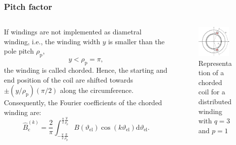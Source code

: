 \begin{frame}
	\frametitle{Pitch factor}
    \begin{columns}
		\begin{column}{0.6\textwidth}
	        If windings are not implemented as diametral winding, i.e., the winding width $y$ is smaller than the pole pitch $\rho_\mathrm{p}$, 
            $$y < \rho_\mathrm{p}=\pi,$$
            the winding is called chorded. Hence, the starting and end position of the coil are shifted towards $\pm(y/\rho_\mathrm{p})(\pi/2)$ along the circumference. Consequently, the Fourier coefficients of the chorded winding are:
            \begin{equation}
                \hat{B}_{\mathrm{c}}^{(k)} = \frac{2}{\pi} \int_{-\frac{\pi}{2}\frac{y}{\rho_\mathrm{p}}}^{\frac{\pi}{2}\frac{y}{\rho_\mathrm{p}}} B(\vartheta_\mathrm{el}) \cos(k \vartheta_\mathrm{el}) \mathrm{d}\vartheta_\mathrm{el}.
                \label{eq:Pitch_factor_fourier_coefficients}
            \end{equation}
        \end{column}
        \begin{column}{0.4\textwidth}
            \begin{figure}
                \centering
                \includegraphics[width=0.9\textwidth]{fig/lec05/Single_phase_chording.pdf}
                \caption{Representation of a chorded coil for a distributed winding with $q=3$ and $p=1$}
                \label{fig:Single_phase_chording}
            \end{figure}
        \end{column}
    \end{columns}
\end{frame}

